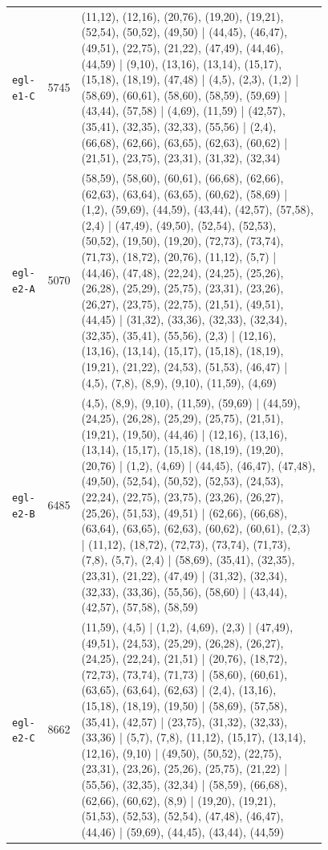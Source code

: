 \begin{landscape}
\begin{longtable}{lr>{\tiny\raggedright\arraybackslash}p{0.78\linewidth}}
\texttt{egl-e1-C} & 5745 & (11,12), (12,16), (20,76), (19,20), (19,21), (52,54), (50,52), (49,50) | (44,45), (46,47), (49,51), (22,75), (21,22), (47,49), (44,46), (44,59) | (9,10), (13,16), (13,14), (15,17), (15,18), (18,19), (47,48) | (4,5), (2,3), (1,2) | (58,69), (60,61), (58,60), (58,59), (59,69) | (43,44), (57,58) | (4,69), (11,59) | (42,57), (35,41), (32,35), (32,33), (55,56) | (2,4), (66,68), (62,66), (63,65), (62,63), (60,62) | (21,51), (23,75), (23,31), (31,32), (32,34) \\[2pt]
\texttt{egl-e2-A} & 5070 & (58,59), (58,60), (60,61), (66,68), (62,66), (62,63), (63,64), (63,65), (60,62), (58,69) | (1,2), (59,69), (44,59), (43,44), (42,57), (57,58), (2,4) | (47,49), (49,50), (52,54), (52,53), (50,52), (19,50), (19,20), (72,73), (73,74), (71,73), (18,72), (20,76), (11,12), (5,7) | (44,46), (47,48), (22,24), (24,25), (25,26), (26,28), (25,29), (25,75), (23,31), (23,26), (26,27), (23,75), (22,75), (21,51), (49,51), (44,45) | (31,32), (33,36), (32,33), (32,34), (32,35), (35,41), (55,56), (2,3) | (12,16), (13,16), (13,14), (15,17), (15,18), (18,19), (19,21), (21,22), (24,53), (51,53), (46,47) | (4,5), (7,8), (8,9), (9,10), (11,59), (4,69) \\[2pt]
\texttt{egl-e2-B} & 6485 & (4,5), (8,9), (9,10), (11,59), (59,69) | (44,59), (24,25), (26,28), (25,29), (25,75), (21,51), (19,21), (19,50), (44,46) | (12,16), (13,16), (13,14), (15,17), (15,18), (18,19), (19,20), (20,76) | (1,2), (4,69) | (44,45), (46,47), (47,48), (49,50), (52,54), (50,52), (52,53), (24,53), (22,24), (22,75), (23,75), (23,26), (26,27), (25,26), (51,53), (49,51) | (62,66), (66,68), (63,64), (63,65), (62,63), (60,62), (60,61), (2,3) | (11,12), (18,72), (72,73), (73,74), (71,73), (7,8), (5,7), (2,4) | (58,69), (35,41), (32,35), (23,31), (21,22), (47,49) | (31,32), (32,34), (32,33), (33,36), (55,56), (58,60) | (43,44), (42,57), (57,58), (58,59) \\[2pt]
\texttt{egl-e2-C} & 8662 & (11,59), (4,5) | (1,2), (4,69), (2,3) | (47,49), (49,51), (24,53), (25,29), (26,28), (26,27), (24,25), (22,24), (21,51) | (20,76), (18,72), (72,73), (73,74), (71,73) | (58,60), (60,61), (63,65), (63,64), (62,63) | (2,4), (13,16), (15,18), (18,19), (19,50) | (58,69), (57,58), (35,41), (42,57) | (23,75), (31,32), (32,33), (33,36) | (5,7), (7,8), (11,12), (15,17), (13,14), (12,16), (9,10) | (49,50), (50,52), (22,75), (23,31), (23,26), (25,26), (25,75), (21,22) | (55,56), (32,35), (32,34) | (58,59), (66,68), (62,66), (60,62), (8,9) | (19,20), (19,21), (51,53), (52,53), (52,54), (47,48), (46,47), (44,46) | (59,69), (44,45), (43,44), (44,59) \\[2pt]

\end{longtable}
\end{landscape}
